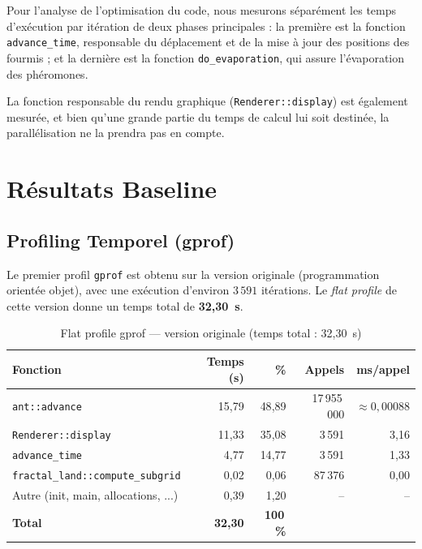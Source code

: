 \documentclass[12pt,a4paper]{article}
\begin{document}
Pour l'analyse de l'optimisation du code, nous mesurons séparément les temps d'exécution par itération de deux phases principales : la première est la fonction \texttt{advance\_time}, responsable du déplacement et de la mise à jour des positions des fourmis ; et la dernière est la fonction \texttt{do\_evaporation}, qui assure l'évaporation des phéromones.

La fonction responsable du rendu graphique (\texttt{Renderer::display}) est également mesurée, et bien qu'une grande partie du temps de calcul lui soit destinée, la parallélisation ne la prendra pas en compte.

\section{Résultats Baseline}
\label{sec:baseline}

\subsection{Profiling Temporel (gprof)}
Le premier profil \texttt{gprof} est obtenu sur la version originale (programmation orientée objet), avec une exécution d'environ $3\,591$ itérations. Le \emph{flat profile} de cette version donne un temps total de \textbf{32,30~s}. 

\begin{table}[H]
    \centering
    \caption{Flat profile gprof --- version originale (temps total : 32,30~s)}
    \begin{tabular}{lrrrr}
        \toprule
        \textbf{Fonction} & \textbf{Temps (s)} & \textbf{\%} & \textbf{Appels} & \textbf{ms/appel} \\
        \midrule
        \texttt{ant::advance} & 15{,}79 & 48{,}89 & 17\,955\,000 & $\approx 0{,}00088$ \\
        \texttt{Renderer::display} & 11{,}33 & 35{,}08 & 3\,591 & 3{,}16 \\
        \texttt{advance\_time} & 4{,}77 & 14{,}77 & 3\,591 & 1{,}33 \\
        \texttt{fractal\_land::compute\_subgrid} & 0{,}02 & 0{,}06 & 87\,376 & 0{,}00 \\
        Autre (init, main, allocations, ...) & 0{,}39 & 1{,}20 & -- & -- \\
        \midrule
        \textbf{Total} & \textbf{32{,}30} & \textbf{100\,\%} & & \\
        \bottomrule
    \end{tabular}
\end{table}
\end{document}
